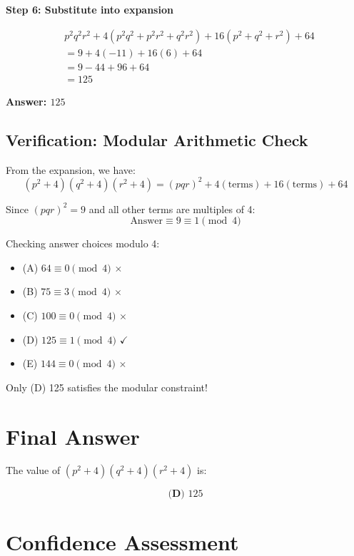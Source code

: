 \documentclass[12pt]{article}
\begin{document}
\textbf{Step 6: Substitute into expansion}

\begin{align*}
&p^2q^2r^2 + 4(p^2q^2 + p^2r^2 + q^2r^2) + 16(p^2 + q^2 + r^2) + 64\\
&= 9 + 4(-11) + 16(6) + 64\\
&= 9 - 44 + 96 + 64\\
&= 125
\end{align*}

\textbf{Answer: $\boxed{125}$}

\subsection*{Verification: Modular Arithmetic Check}

From the expansion, we have:
\[(p^2 + 4)(q^2 + 4)(r^2 + 4) = (pqr)^2 + 4(\text{terms}) + 16(\text{terms}) + 64\]

Since $(pqr)^2 = 9$ and all other terms are multiples of 4:
\[\text{Answer} \equiv 9 \equiv 1 \pmod{4}\]

Checking answer choices modulo 4:
\begin{itemize}
    \item (A) $64 \equiv 0 \pmod{4}$ $\times$
    \item (B) $75 \equiv 3 \pmod{4}$ $\times$
    \item (C) $100 \equiv 0 \pmod{4}$ $\times$
    \item (D) $125 \equiv 1 \pmod{4}$ $\checkmark$
    \item (E) $144 \equiv 0 \pmod{4}$ $\times$
\end{itemize}

Only (D) 125 satisfies the modular constraint!

\section*{Final Answer}

The value of $(p^2 + 4)(q^2 + 4)(r^2 + 4)$ is:

$$\boxed{\textbf{(D) } 125}$$

\section*{Confidence Assessment}
\end{document}
